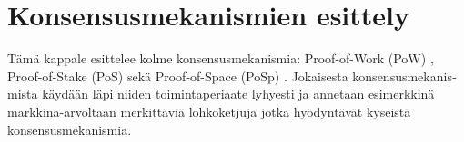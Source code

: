 \chapter{Konsensusmekanismien esittely\label{esittely}}
\begin{otherlanguage}{english}

Tämä kappale esittelee kolme konsensusmekanismia: Proof-of-Work (PoW) \cite{blockchain1}, Proof-of-Stake (PoS) \cite{pos1} sekä Proof-of-Space (PoSp) \cite{posp2}. Jokaisesta konsensusmekanismista käydään läpi niiden toimintaperiaate lyhyesti ja annetaan esimerkkinä markkina-arvoltaan merkittäviä lohkoketjuja jotka hyödyntävät kyseistä konsensusmekanismia.




\end{otherlanguage}